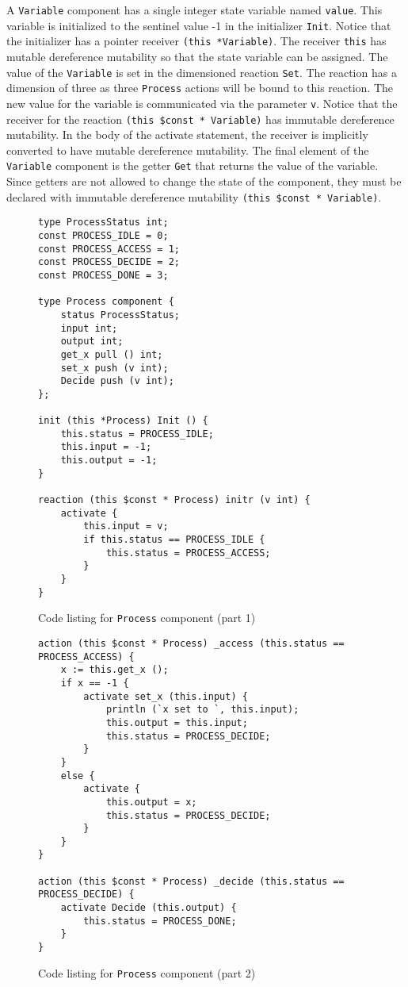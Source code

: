 \clearpage

A \verb+Variable+ component has a single integer state variable named \verb+value+.
This variable is initialized to the sentinel value -1 in the initializer \verb+Init+.
Notice that the initializer has a pointer receiver \verb+(this *Variable)+.
The receiver \verb+this+ has mutable dereference mutability so that the state variable can be assigned.
The value of the \verb+Variable+ is set in the dimensioned reaction \verb+Set+.
The reaction has a dimension of three as three \verb+Process+ actions will be bound to this reaction.
The new value for the variable is communicated via the parameter \verb+v+.
Notice that the receiver for the reaction \verb+(this $const * Variable)+ has immutable dereference mutability.
In the body of the activate statement, the receiver is implicitly converted to have mutable dereference mutability.
The final element of the \verb+Variable+ component is the getter \verb+Get+ that returns the value of the variable.
Since getters are not allowed to change the state of the component, they must be declared with immutable dereference mutability \verb+(this $const * Variable)+.

\begin{figure}
\begin{verbatim}
type ProcessStatus int;
const PROCESS_IDLE = 0;
const PROCESS_ACCESS = 1;
const PROCESS_DECIDE = 2;
const PROCESS_DONE = 3;

type Process component {
    status ProcessStatus;
    input int;
    output int;
    get_x pull () int;
    set_x push (v int);
    Decide push (v int);
};

init (this *Process) Init () {
    this.status = PROCESS_IDLE;
    this.input = -1;
    this.output = -1;
}

reaction (this $const * Process) initr (v int) {
    activate {
        this.input = v;
        if this.status == PROCESS_IDLE {
            this.status = PROCESS_ACCESS;
        }
    }
}
\end{verbatim}
\cprotect\caption{Code listing for \verb+Process+ component (part 1)}
\label{process1}
\end{figure}

\begin{figure}
\begin{verbatim}
action (this $const * Process) _access (this.status == PROCESS_ACCESS) {
    x := this.get_x ();
    if x == -1 {
        activate set_x (this.input) {
            println (`x set to `, this.input);
            this.output = this.input;
            this.status = PROCESS_DECIDE;
        }
    }
    else {
        activate {
            this.output = x;
            this.status = PROCESS_DECIDE;
        }
    }
}

action (this $const * Process) _decide (this.status == PROCESS_DECIDE) {
    activate Decide (this.output) {
        this.status = PROCESS_DONE;
    }
}
\end{verbatim}
\cprotect\caption{Code listing for \verb+Process+ component (part 2)}
\label{process2}
\end{figure}

